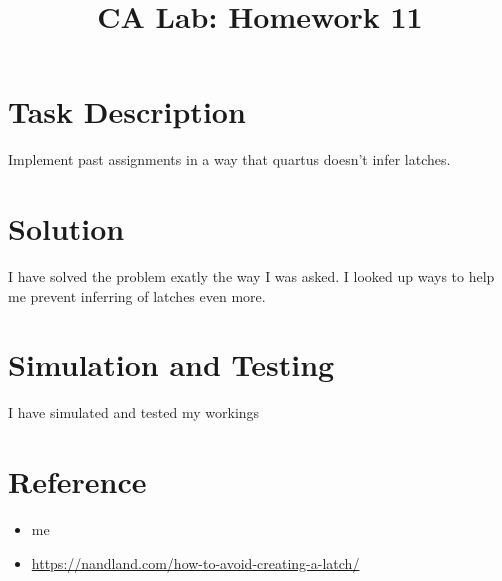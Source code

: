 \documentclass{../../../template}
\title{CA Lab: Homework 11}
\begin{document}
    \maketitle

    \section*{Task Description}

    Implement past assignments in a way that quartus doesn't infer latches.

    \section*{Solution}

    I have solved the problem exatly the way I was asked. I looked up ways to help me prevent inferring of latches even more.

    \section*{Simulation and Testing}

    I have simulated and tested my workings

    \section*{Reference}

    \begin{itemize}
        \item me
        \item \url{https://nandland.com/how-to-avoid-creating-a-latch/}
    \end{itemize}
\end{document}

